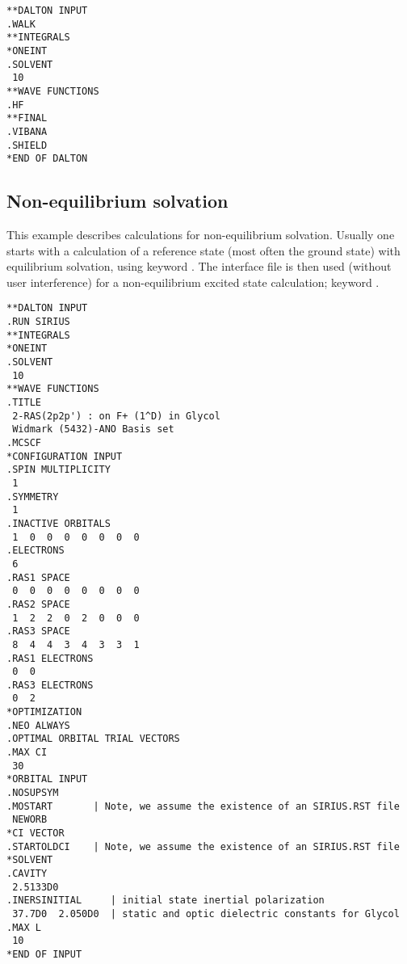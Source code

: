 \begin{verbatim}
**DALTON INPUT
.WALK
**INTEGRALS
*ONEINT
.SOLVENT
 10
**WAVE FUNCTIONS
.HF
**FINAL
.VIBANA
.SHIELD
*END OF DALTON
\end{verbatim}


\subsection{Non-equilibrium solvation}

This example describes calculations for non-equilibrium
solvation. Usually one starts with a calculation of a reference state
(most often the ground state) with equilibrium solvation, using
keyword . The interface file is then
used (without user interference) for
a non-equilibrium excited state calculation; keyword
.

\begin{verbatim}
**DALTON INPUT
.RUN SIRIUS
**INTEGRALS
*ONEINT
.SOLVENT
 10
**WAVE FUNCTIONS
.TITLE
 2-RAS(2p2p') : on F+ (1^D) in Glycol
 Widmark (5432)-ANO Basis set
.MCSCF
*CONFIGURATION INPUT
.SPIN MULTIPLICITY
 1
.SYMMETRY
 1
.INACTIVE ORBITALS
 1  0  0  0  0  0  0  0
.ELECTRONS
 6
.RAS1 SPACE
 0  0  0  0  0  0  0  0
.RAS2 SPACE
 1  2  2  0  2  0  0  0
.RAS3 SPACE
 8  4  4  3  4  3  3  1
.RAS1 ELECTRONS
 0  0
.RAS3 ELECTRONS
 0  2
*OPTIMIZATION
.NEO ALWAYS
.OPTIMAL ORBITAL TRIAL VECTORS
.MAX CI
 30
*ORBITAL INPUT
.NOSUPSYM
.MOSTART       | Note, we assume the existence of an SIRIUS.RST file
 NEWORB
*CI VECTOR
.STARTOLDCI    | Note, we assume the existence of an SIRIUS.RST file
*SOLVENT
.CAVITY
 2.5133D0
.INERSINITIAL     | initial state inertial polarization
 37.7D0  2.050D0  | static and optic dielectric constants for Glycol
.MAX L
 10
*END OF INPUT
\end{verbatim}
